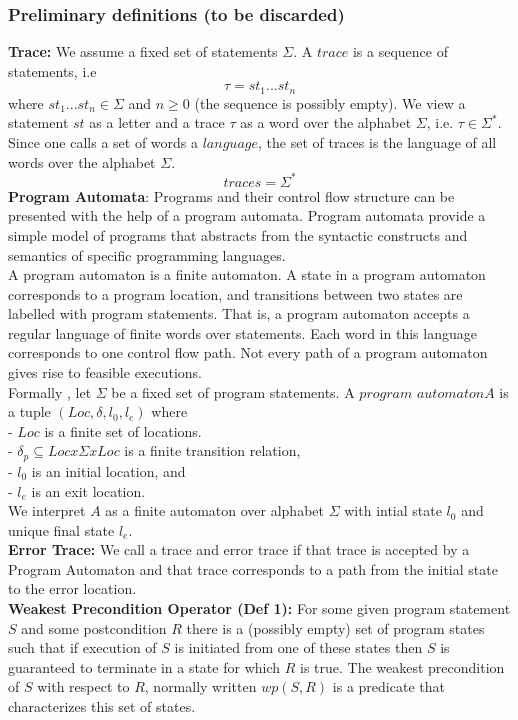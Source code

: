 \documentclass{article}
\begin{document}
\subsubsection{Preliminary definitions (to be discarded)}
\textbf{Trace:} We assume a fixed set of statements $\Sigma$. A $trace$ is a sequence of statements, i.e $$ \tau = st_1 ... st_n$$
where $st_1...st_n \in \Sigma$ and $n \geq 0$ (the sequence is possibly empty). We view a statement $st$ as a letter and a trace $\tau$ as a word over the alphabet $\Sigma$, i.e. $\tau \in \Sigma^*$. Since one calls a set of words a $language$, the set of traces is the language of all words over the alphabet $\Sigma$.
$${traces} = \Sigma^*$$
\textbf{Program Automata}: Programs and their control flow structure can be presented with the help of a program automata. Program automata provide a simple model of programs that abstracts from the syntactic constructs and semantics of specific programming languages.\\
A program automaton is a finite automaton. A state in a program automaton corresponds to a program location, and transitions between two states are labelled with program statements. That is, a program automaton accepts a regular language of finite words over statements. Each word in this language corresponds to one control flow path. Not every path of a program automaton gives rise to feasible executions.\\
Formally , let $\Sigma$ be a fixed set of program statements. A $program$ $automaton A$ is a tuple $(Loc, \delta,l_0,l_e)$ where
\\
- $Loc$ is a finite set of locations.\\
- $\delta_p \subseteq Loc x \Sigma x Loc$ is a finite transition relation,\\
- $l_0$ is an initial location, and\\
- $l_e$ is an exit location.\\
We interpret $A$ as a finite automaton over alphabet $\Sigma$ with intial state $l_0$ and unique final state $l_e$.\\
\textbf{Error Trace:} We call a trace and error trace if that trace is accepted by a Program Automaton and that trace corresponds to a path from the initial state to the error location. \\
\textbf{Weakest Precondition Operator (Def 1): }For some given program statement $S$ and some postcondition $R$ there is a (possibly empty) set of program states such that if execution of $S$ is initiated from one of these states then $S$ is guaranteed to terminate in a state for which $R$ is true. The weakest precondition of $S$ with respect to $R$, normally written $wp (S,R)$ is a predicate that characterizes this set of states.\\
\end{document}

